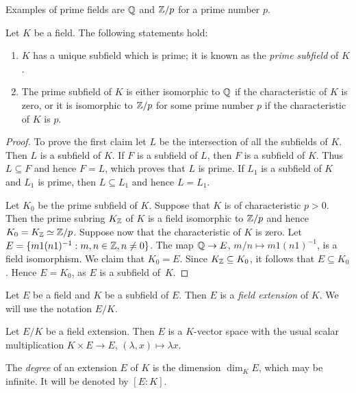 Examples of prime fields are $\mathbb{Q}$ and $\mathbb{Z}/p$ for a prime number $p$.

\begin{proposition}
\label{pro:prime subfield}
	Let $K$ be a field. The following statements hold:
	\begin{enumerate}
		\item $K$ has a unique subfield which is prime; it is known as the 
			\emph{prime subfield} of $K$.
		\item The prime subfield of $K$ is either isomorphic to $\mathbb{Q}$ if 
			the characteristic of $K$ is zero, or it is isomorphic to $\mathbb{Z}/p$ for
			some prime number $p$ if the characteristic of $K$ is $p$. 
	\end{enumerate}
\end{proposition}

\begin{proof}
	To prove the first claim let $L$ be the intersection
	of all the subfields of $K$. Then $L$ is a subfield of $K$. 
	If $F$ is a subfield of $L$, then $F$ is a subfield
	of $K$. Thus $L\subseteq F$ and hence $F=L$, which proves
	that $L$ is prime. If $L_1$ is a subfield of $K$
	and $L_1$ is prime, then $L\subseteq L_1$ and 
	hence $L=L_1$. 

	Let $K_0$ be the prime subfield of $K$. Suppose that $K$ is of characteristic
	$p>0$. Then the prime subring $K_{\mathbb{Z}}$ of $K$ 
	is a field isomorphic to $\mathbb{Z}/p$ and hence $K_0=
	K_{\mathbb{Z}}\simeq \mathbb{Z}/p$. Suppose now that the characteristic of $K$ is zero. Let
	$E=\{m1(n1)^{-1}:m,n\in\mathbb{Z},n\ne 0\}$. 
	The map $\mathbb{Q}\to E$, $m/n\mapsto m1(n1)^{-1}$,
	is a field isomorphism.
	We claim that $K_0=E$. Since $K_{\mathbb{Z}}\subseteq
	K_0$, it follows that $E\subseteq K_0$. Hence $E=K_0$, as $E$ is a subfield
	of~$K$.  
\end{proof}

\begin{definition}
	Let $E$ be a field and $K$ be a subfield of $E$. Then 
	$E$ is a \emph{field extension} of $K$. We will use
	the notation $E/K$. 
\end{definition}

Let $E/K$ be a field extension. Then $E$ 
is a $K$-vector space with the usual scalar multiplication
$K\times E\to E$, 
$(\lambda, x)\mapsto \lambda x$.

\begin{definition}
	The \emph{degree} of an extension $E$ of $K$ 
	is the dimension $\dim_KE$, which may be infinite. 
  It will be denoted by $[E:K]$. 
\end{definition}

